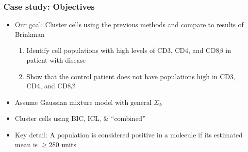 \documentclass[mathserif,compress]{beamer}
\renewcommand\;{\,}
\begin{document}
\begin{frame}\frametitle{Case study: Objectives}
\begin{itemize}
\item[]
\alert{Our goal}: Cluster cells using the previous methods and compare to results of Brinkman
\bigskip
\begin{enumerate}
\item
Identify cell populations with high levels of CD3, CD4, and CD8$\beta$ in patient with disease
\bigskip
\item
Show that the control patient does not have populations high in CD3, CD4, and CD8$\beta$
\end{enumerate}
\bigskip
\item[]
Assume Gaussian mixture model with general $\Sigma_k$
\bigskip
\item[]
Cluster cells using BIC, ICL, \& ``combined''
\bigskip
\item[]
\alert{Key detail}: A population is considered positive in a molecule if its estimated mean is $\ge 280$ units
\end{itemize}
\end{frame}
\end{document}
